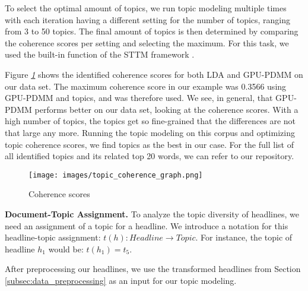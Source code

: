 To select the optimal amount of topics, we run topic modeling multiple times with each iteration having a different setting for the number of topics, ranging from 3 to 50 topics. 
The final amount of topics is then determined by comparing the coherence scores per setting and selecting the maximum. 
For this task, we used the built-in function of the STTM framework \citep{qiang_short_2020}. 

Figure \textit{\ref{fig:coherence_scores}} shows the identified coherence scores for both LDA and GPU-PDMM on our data set. The maximum coherence score in our example was 0.3566 using GPU-PDMM and  topics, and was therefore used. We see, in general, that GPU-PDMM performs better on our data set, looking at the coherence scores. With a high number of topics, the topics get so fine-grained that the differences are not that large any more. 
Running the topic modeling on this corpus and optimizing topic coherence scores, we find  topics as the best in our case. For the full list of all identified topics and its related top 20 words, we can refer to our repository. 

\begin{figure}[tb]
    \centering
    \texttt{[image: images/topic\_coherence\_graph.png]}
    \caption{Coherence scores}
    \label{fig:coherence_scores}
\end{figure}


\textbf{Document-Topic Assignment. }
%
To analyze the topic diversity of headlines, we need an assignment of a topic for a headline. We introduce a notation for this headline-topic assignment:
$t(h): Headline \rightarrow Topic$. For instance, the topic of headline $h_1$ would be: $t(h_1) = t_5$.

After preprocessing our headlines, we use the transformed headlines from Section \ref{subsec:data_preprocessing} as an input for our topic modeling. 

